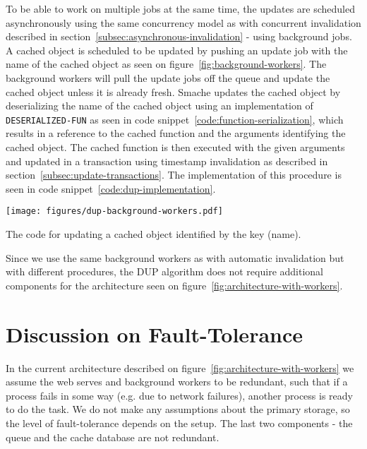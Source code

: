To be able to work on multiple jobs at the same time, the updates are scheduled asynchronously using the same concurrency model as with concurrent invalidation described in section~\ref{subsec:asynchronous-invalidation} - using background jobs. A cached object is scheduled to be updated by pushing an update job with the name of the cached object as seen on figure~\ref{fig:background-workers}. The background workers will pull the update jobs off the queue and update the cached object unless it is already fresh. Smache updates the cached object by deserializing the name of the cached object using an implementation of \verb$DESERIALIZED-FUN$ as seen in code snippet~\ref{code:function-serialization}, which results in a reference to the cached function and the arguments identifying the cached object. The cached function is then executed with the given arguments and updated in a transaction using timestamp invalidation as described in section~\ref{subsec:update-transactions}. The implementation of this procedure is seen in code snippet~\ref{code:dup-implementation}.

\begin{figure*}[ht!]
  \centering
  \texttt{[image: figures/dup-background-workers.pdf]}
  \caption{How Smache schedules cached objects to be updated using background workers}
  \label{fig:dup-background-workers}
\end{figure*}

\begin{code}{The code for updating a cached object identified by the key (name).}
  \centering
  
  \label{code:dup-implementation}
\end{code}

Since we use the same background workers as with automatic invalidation but with different procedures, the DUP algorithm does not require additional components for the architecture seen on figure~\ref{fig:architecture-with-workers}.


\section{Discussion on Fault-Tolerance}
\label{sec:discussion-on-fault-tolerance}

In the current architecture described on figure~\ref{fig:architecture-with-workers} we assume the web serves and background workers to be redundant, such that if a process fails in some way (e.g. due to network failures), another process is ready to do the task. We do not make any assumptions about the primary storage, so the level of fault-tolerance depends on the setup. The last two components - the queue and the cache database are not redundant.

